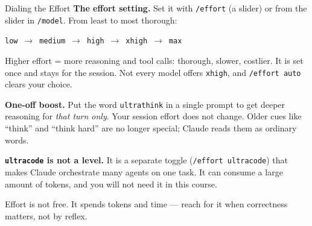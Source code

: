 \documentclass[aspectratio=169, 11pt]{beamer}
\begin{document}
\begin{frame}{Dialing the Effort}
  \textbf{The effort setting.} Set it with \texttt{/effort} (a slider) or from the slider in \texttt{/model}. From least to most thorough:
  \begin{center}
    \small\texttt{low} \,$\to$\, \texttt{medium} \,$\to$\, \texttt{high} \,$\to$\, \texttt{xhigh} \,$\to$\, \texttt{max}
  \end{center}
  Higher effort = more reasoning and tool calls: thorough, slower, costlier. It is set once and stays for the session. Not every model offers \texttt{xhigh}, and \texttt{/effort auto} clears your choice.

  \vspace{0.6em}
  \textbf{One-off boost.} Put the word \texttt{ultrathink} in a single prompt to get deeper reasoning for \emph{that turn only}. Your session effort does not change. Older cues like ``think'' and ``think hard'' are no longer special; Claude reads them as ordinary words.

  \vspace{0.6em}
  \textbf{\texttt{ultracode} is not a level.} It is a separate toggle (\texttt{/effort ultracode}) that makes Claude orchestrate many agents on one task. It can consume a large amount of tokens, and you will not need it in this course.

  \vspace{0.5em}
  \alert{Effort is not free.} It spends tokens and time --- reach for it when correctness matters, not by reflex.
\end{frame}
\end{document}
